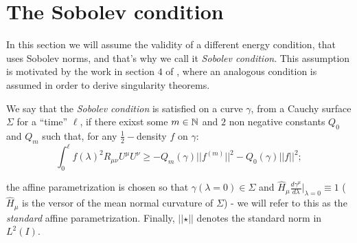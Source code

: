 \section{The Sobolev condition}
In this section we will assume the validity of a different energy condition, that uses Sobolev norms, and that's why we call it \emph{Sobolev condition}.
This assumption is motivated by the work in section \(4\) of \cite{fewster2020new}, where an analogous condition is assumed in order to derive singularity theorems.

\begin{definition}
	We say that the \emph{Sobolev condition} is satisfied on a curve \(\gamma\), from a Cauchy surface \(\Sigma\) for a ``time'' \(\ell\), if there exixst some \(m\in {\mathbb{N}}\) and \(2\) non negative constants \(Q_0\) and \(Q_m\) such that, for any \(\frac{1}{2}-\)density \(f\) on \(\gamma\):
    \begin{equation}
        \label{eq:Sobolev-condition}
        \int_0^{\ell} f(\lambda)^2 R_{\mu\nu}U^{\mu}U^{\nu} \ge -Q_m(\gamma) \vert\vert f^{(m)}\vert\vert^2 - Q_0(\gamma) \vert\vert f\vert\vert^2;
    \end{equation}

	the affine parametrization is chosen so that \(\gamma(\lambda = 0) \in \Sigma\) and \(\hat{H}_{\mu}\frac{d\gamma^{\mu}}{d\lambda}\Big\vert_{\lambda = 0} \equiv 1\) (\(\hat{H}_{\mu}\) is the versor of the mean normal curvature of \(\Sigma\)) - we will refer to this as the \emph{standard} affine parametrization. Finally, \(\vert\vert \star \vert\vert\) denotes the standard norm in \(L^2(I)\).
\end{definition}

